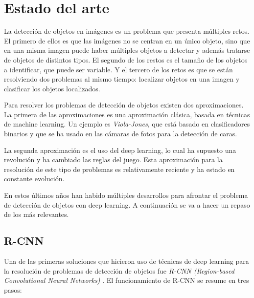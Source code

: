 \section{Estado del arte}
\label{sec:estado_del_arte}

La detección de objetos en imágenes es un problema que presenta múltiples retos. El primero de ellos es que las imágenes no se centran en un único objeto, sino que en una misma imagen puede haber múltiples objetos a detectar y además tratarse de objetos de distintos tipos. El segundo de los restos es el tamaño de los objetos a identificar, que puede ser variable. Y el tercero de los retos es que se están resolviendo dos problemas al mismo tiempo: localizar objetos en una imagen y clasificar los objetos localizados.

Para resolver los problemas de detección de objetos existen dos aproximaciones. La primera de las aproximaciones es una aproximación clásica, basada en técnicas de machine learning. Un ejemplo es \textit{Viola-Jones}, que está basado en clasificadores binarios y que se ha usado en las cámaras de fotos para la detección de caras.

La segunda aproximación es el uso del deep learning, lo cual ha supuesto una revolución y ha cambiado las reglas del juego. Esta aproximación para la resolución de este tipo de problemas es relativamente reciente y ha estado en constante evolución.

En estos últimos años han habido múltiples desarrollos para afrontar el problema de detección de objetos con deep learning. A continuación se va a hacer un repaso de los más relevantes.

\subsection*{R-CNN}

Una de las primeras soluciones que hicieron uso de técnicas de deep learning para la resolución de problemas de detección de objetos fue \textit{R-CNN (Region-based Convolutional Neural Networks)} \cite{s2_stateofart_rcnn}. El funcionamiento de R-CNN se resume en tres pasos:


